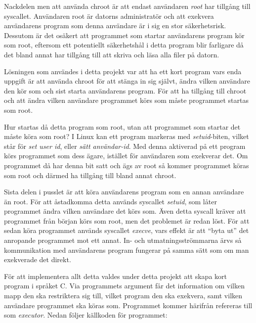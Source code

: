 \documentclass{article}
\begin{document}
Nackdelen men att använda chroot är att endast användaren \textit{root} har
tillgång till syscallet. Användaren root är datorns administratör och att
exekvera an\-vändarens program som denna användare är i sig en stor säkerhetsrisk.
Dessutom är det osäkert att programmet som startar användarens program kör som
root, eftersom ett potentiellt säkerhetshål i detta program blir farligare då
det bland annat har tillgång till att skriva och läsa alla filer på datorn.

Lösningen som användes i detta projekt var att ha ett kort program vars enda
uppgift är att använda chroot för att stänga in sig självt, ändra vilken
användare den kör som och sist starta användarens program. För att ha tillgång
till chroot och att ändra vilken användare programmet körs som måste programmet
startas som root.

Hur startas då detta program som root, utan att programmet som startar det måste
köra som root? I Linux kan ett program markeras med \textit{setuid}-biten,
vilket står för \textit{set user id}, eller \textit{sätt användar-id}. Med
denna aktiverad på ett program körs programmet som dess ägare, istället för
användaren som exekverar det. Om programmet då har denna bit satt och ägs av
root så kommer programmet köras som root och därmed ha tillgång till bland annat
chroot.

Sista delen i pusslet är att köra användarens program som en annan användare än
root. För att åstadkomma detta används syscallet \textit{setuid}, som låter
programmet ändra vilken användare det körs som. Även detta syscall kräver att
programmet från början körs som root, men det problemet är redan löst. För att
sedan köra programmet används syscallet \textit{execve}, vars effekt är att
``byta ut'' det anropande programmet mot ett annat. In- och utmatningsströmmarna
ärvs så kommunikation med användarens program fungerar på samma sätt som om man
exekverade det direkt.

\hypertarget{executor}{}
\label{executor}

För att implementera allt detta valdes under detta projekt att skapa kort
program i språket C. Via programmets argument får det information om vilken mapp
den ska restriktera sig till, vilket program den ska exekvera, samt vilken
användare programmet ska köras som. Programmet kommer härifrån refereras till
som \textit{executor}. Nedan följer källkoden för programmet:
\end{document}
